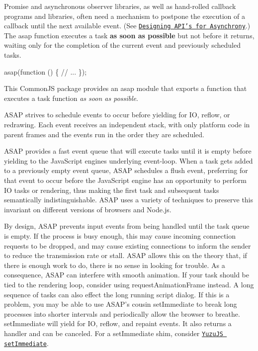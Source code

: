 \href{https://travis-ci.org/kriskowal/asap}{\tt }

Promise and asynchronous observer libraries, as well as hand-\/rolled callback programs and libraries, often need a mechanism to postpone the execution of a callback until the next available event. (See \href{http://blog.izs.me/post/59142742143/designing-apis-for-asynchrony}{\tt Designing A\+P\+I’s for Asynchrony}.) The {\ttfamily asap} function executes a task {\bfseries as soon as possible} but not before it returns, waiting only for the completion of the current event and previously scheduled tasks.


\begin{DoxyCode}
asap(function () \{
    // ...
\});
\end{DoxyCode}


This Common\+JS package provides an {\ttfamily asap} module that exports a function that executes a task function {\itshape as soon as possible}.

A\+S\+AP strives to schedule events to occur before yielding for IO, reflow, or redrawing. Each event receives an independent stack, with only platform code in parent frames and the events run in the order they are scheduled.

A\+S\+AP provides a fast event queue that will execute tasks until it is empty before yielding to the Java\+Script engine\textquotesingle{}s underlying event-\/loop. When a task gets added to a previously empty event queue, A\+S\+AP schedules a flush event, preferring for that event to occur before the Java\+Script engine has an opportunity to perform IO tasks or rendering, thus making the first task and subsequent tasks semantically indistinguishable. A\+S\+AP uses a variety of techniques to preserve this invariant on different versions of browsers and Node.\+js.

By design, A\+S\+AP prevents input events from being handled until the task queue is empty. If the process is busy enough, this may cause incoming connection requests to be dropped, and may cause existing connections to inform the sender to reduce the transmission rate or stall. A\+S\+AP allows this on the theory that, if there is enough work to do, there is no sense in looking for trouble. As a consequence, A\+S\+AP can interfere with smooth animation. If your task should be tied to the rendering loop, consider using {\ttfamily request\+Animation\+Frame} instead. A long sequence of tasks can also effect the long running script dialog. If this is a problem, you may be able to use A\+S\+A\+P’s cousin {\ttfamily set\+Immediate} to break long processes into shorter intervals and periodically allow the browser to breathe. {\ttfamily set\+Immediate} will yield for IO, reflow, and repaint events. It also returns a handler and can be canceled. For a {\ttfamily set\+Immediate} shim, consider \href{https://github.com/YuzuJS/setImmediate}{\tt Yuzu\+JS set\+Immediate}.

